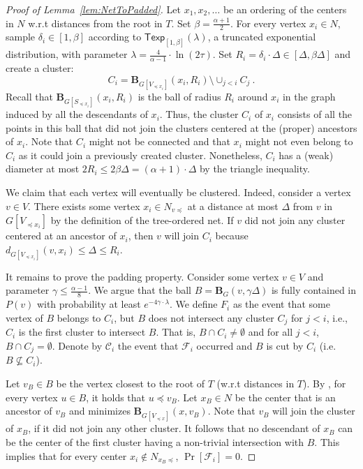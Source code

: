 \documentclass{article}
\newcommand{\Texp}{\mathsf{Texp}}
\def\ball{\mathbf{B}}
\begin{document}
\begin{proof}[Proof of Lemma~\ref{lem:NetToPadded}]	
	Let $x_1,x_2,\dots$ be an ordering of the centers in $N$ w.r.t distances from the root in $T$.
	Set $\beta=\frac{\alpha+1}{2}$.
	For every vertex $x_i\in N$, sample $\delta_i\in[1,\beta]$ according to $\Texp_{[1,\beta]}(\lambda)$, a truncated exponential distribution, with parameter $\lambda=\frac{4}{\alpha-1}\cdot\ln (2\tau)$. Set $R_i=\delta_i\cdot\Delta\in[\Delta,\beta\Delta]$ and create a cluster:
	\[
	C_{i}=\ball_{G[V_{\preceq x_{i}}]}(x_i,R_{i})\setminus\cup_{j<i}C_{j}~.
	\]
	Recall that $\ball_{G[S_{\preceq x_i}]}(x_i,R_{i})$ is the ball of radius $R_i$ around $x_i$ in the graph induced by all the descendants of $x_i$. Thus, the cluster $C_{i}$ of $x_i$ consists of all the points in this ball that did not join the clusters centered at the (proper) ancestors of $x_i$.
	Note that  $C_i$ might not be connected and that $x_i$ might not even belong to $C_i$ as it could join a previously created cluster.  Nonetheless, $C_i$ has a (weak) diameter at most $2R_i \leq 2\beta\Delta=(\alpha+1)\cdot\Delta$ by the triangle inequality.  
	
	We claim that each vertex will eventually be clustered. Indeed, consider a vertex $v\in V$. There exists some vertex $x_i\in N_{v\preceq}$ at a distance at most $\Delta$ from $v$ in $G[V_{\preceq x_i}]$ by the definition of the tree-ordered net.  If $v$ did not join any cluster centered at an ancestor of $x_i$, then $v$ will join $C_i$ because  $d_{G[V_{\preceq x_i}]}(v,x_i)\le \Delta\le R_i$. 
	
	
	It remains to prove the padding property. Consider some vertex $v\in V$ and parameter $\gamma\le\frac{\alpha-1}{8}$. We argue that the ball $B=\ball_G(v,\gamma \Delta)$ is fully contained in $P(v)$ with probability at least $e^{-4\gamma\cdot\lambda}$. We define $F_i$ as the event that some vertex of $B$ belongs to $C_i$, but $B$ does not intersect any cluster $C_j$ for $j < i$, i.e., $C_i$ is the first cluster to intersect $B$. That is, $B\cap C_{i}\ne\emptyset$ and for all $j<i$, $B\cap C_j=\emptyset$. Denote by $\mathcal{C}_i$ the event that $\mathcal{F}_i$ occurred and $B$ is cut by $C_i$ (i.e. $B\nsubseteq C_i$).
	
	
	Let $v_B\in B$ be the vertex closest to the root of $T$ (w.r.t distances in $T$). By , for every vertex $u\in B$, it holds that $u\preceq v_B$. Let $x_B\in N$ be the center that is an ancestor of $v_B$ and minimizes $\ball_{G[V_{\preceq x}]}(x,v_B)$.  Note that $v_B$ will join the cluster of $x_B$, if it did not join any other cluster. It follows that no descendant of $x_B$ can be the center of the first cluster having a non-trivial intersection with $B$. This implies that for every center $x_i\notin N_{x_B\preceq}$, $\Pr[\mathcal{F}_i]=0$.
	

\end{proof}
\end{document}

